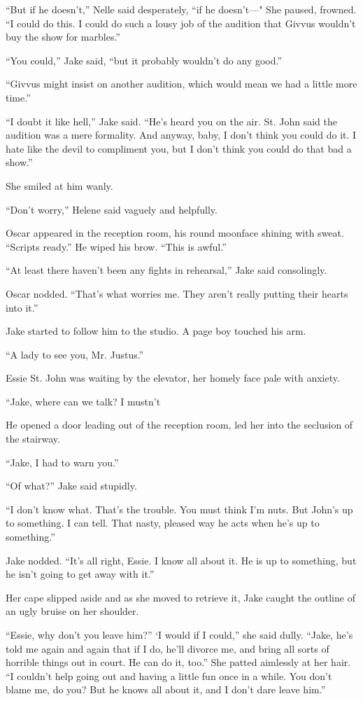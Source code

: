 \documentclass{novel}
\begin{document}
“But if he doesn’t,” Nelle said desperately, “if he doesn’t—" She paused, frowned. “I could do this. I could do such a lousy job of the audition that Givvus wouldn’t buy the show for marbles.”

“You could,” Jake said, “but it probably wouldn’t do any good.”

“Givvus might insist on another audition, which would mean we had a little more time.”

“I doubt it like hell,” Jake said. “He’s heard you on the air. St. John said the audition was a mere formality. And anyway, baby, I don’t think you could do it. I hate like the devil to compliment you, but I don’t think you could do that bad a show.”

She smiled at him wanly.

“Don’t worry,” Helene said vaguely and helpfully.

Oscar appeared in the reception room, his round moonface shining with sweat. “Scripts ready.” He wiped his brow. “This is awful.”

“At least there haven’t been any fights in rehearsal,” Jake said consolingly.

Oscar nodded. “That’s what worries me. They aren’t really putting their hearts into it.”

Jake started to follow him to the studio. A page boy touched his arm.

“A lady to see you, Mr. Justus.”

Essie St. John was waiting by the elevator, her homely face pale with anxiety.

“Jake, where can we talk? I mustn’t

He opened a door leading out of the reception room, led her into the seclusion of the stairway.

“Jake, I had to warn you.”

“Of what?” Jake said stupidly.

“I don’t know what. That’s the trouble. You must think I’m nuts. But John’s up to something. I can tell. That nasty, pleased way he acts when he’s up to something.”

Jake nodded. “It’s all right, Essie. I know all about it. He is up to something, but he isn’t going to get away with it.”

Her cape slipped aside and as she moved to retrieve it, Jake caught the outline of an ugly bruise on her shoulder.

“Essie, why don’t you leave him?” ‘I would if I could,” she said dully. “Jake, he’s told me again and again that if I do, he’ll divorce me, and bring all sorts of horrible things out in court. He can do it, too.” She patted aimlessly at her hair. “I couldn’t help going out and having a little fun once in a while. You don’t blame me, do you? But he knows all about it, and I don’t dare leave him.”
\end{document}
